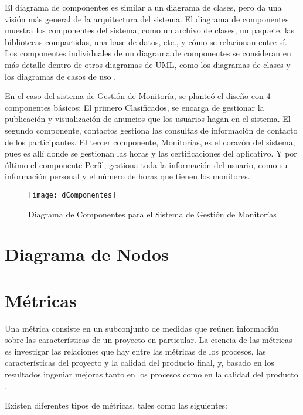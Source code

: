 El diagrama de componentes es similar a un diagrama de clases, pero da una visión más
general de la arquitectura del sistema. El diagrama de componentes muestra los componentes
del sistema, como un archivo de clases, un paquete, las bibliotecas compartidas, una base
de datos, etc., y cómo se relacionan entre sí. Los componentes individuales de un diagrama de
componentes se consideran en más detalle dentro de otros diagramas de UML, como los
diagramas de clases y los diagramas de casos de uso \cite{Kendall_2005}.

En el caso del sistema de Gestión de Monitoría, se planteó el diseño con 4 componentes básicos: El primero Clasificados, se encarga de gestionar la publicación y visualización de anuncios que los usuarios hagan en el sistema. El segundo componente, contactos gestiona las consultas de información de contacto de los participantes. El tercer componente, Monitorías, es el corazón del sistema, pues es allí donde se gestionan las horas y las certificaciones del aplicativo. Y por último el componente Perfil, gestiona toda la información del usuario, como su información personal y el número de horas que tienen los monitores.

\begin{figure}[H]
	\centering
	\texttt{[image: dComponentes]}
	\centering
	\caption{Diagrama de Componentes para el Sistema de Gestión de Monitorías}
	\label{fig:dcomponentes}
\end{figure}
\newpage


\section{Diagrama de Nodos}

\newpage


\section{Métricas}

Una métrica consiste en un subconjunto de medidas que reúnen información sobre las características de un proyecto en particular. La esencia de las métricas es investigar las relaciones que hay entre las métricas de los procesos, las características del proyecto y la calidad del producto final, y, basado en los resultados ingeniar mejoras tanto en los procesos como en la calidad del producto \cite{Stehen_2003}.  

Existen diferentes tipos de métricas, tales como las siguientes:

